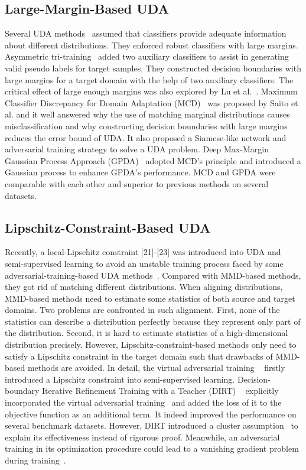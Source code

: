 \documentclass[journal,twocolumn]{IEEEtran}
\theoremstyle{definition}
\begin{document}
\subsection{Large-Margin-Based UDA}
Several UDA methods~\cite{pmlr-v70-saito17a,saito2018maximum} assumed that classifiers provide adequate information about different distributions. They enforced robust classifiers with large margins. Asymmetric tri-training~\cite{pmlr-v70-saito17a} added two auxiliary classifiers to assist in generating valid pseudo labels for target samples. They constructed decision boundaries with large margins for a target domain with the help of two auxiliary classifiers. The critical effect of large enough margins was also explored by Lu et al.~\cite{8325317}. Maximum Classifier Discrepancy for Domain Adaptation (MCD)~\cite{saito2018maximum} was proposed by Saito et al. and it well answered why the use of matching marginal distributions causes misclassification and why constructing decision boundaries with large margins reduces the error bound of UDA. It also proposed a Siamese-like network and adversarial training strategy to solve a UDA problem. Deep Max-Margin Gaussian Process Approach (GPDA)~\cite{8953535} adopted MCD's principle and introduced a Gaussian process to enhance GPDA's performance. MCD and GPDA were comparable with each other and superior to previous methods on several datasets.

\subsection{Lipschitz-Constraint-Based UDA} 
Recently, a local-Lipschitz constraint [21]-[23]
was introduced into UDA and semi-supervised learning to avoid an unstable training process faced by some adversarial-training-based UDA methods~\cite{8833506}. Compared with MMD-based methods, they got rid of matching different distributions. When aligning distributions, MMD-based methods need to estimate some statistics of both source and target domains. Two problems are confronted in such alignment. First, none of the statistics can describe a distribution perfectly because they represent only part of the distribution. Second, it is hard to estimate statistics of a high-dimensional distribution precisely. However, Lipschitz-constraint-based methods only need to satisfy a Lipschitz constraint in the target domain such that drawbacks of MMD-based methods are avoided. In detail, the virtual adversarial training ~\cite{miyato2018virtual} firstly introduced a Lipschitz constraint into semi-supervised learning. Decision-boundary Iterative Refinement Training with a Teacher (DIRT) ~\cite{shu2018a} explicitly incorporated the virtual adversarial training~\cite{miyato2018virtual} and added the loss of it to the objective function as an additional term. It indeed improved the performance on several benchmark datasets. However, DIRT introduced a cluster assumption~\cite{grandvalet2004semi-supervised} to explain its effectiveness instead of rigorous proof. Meanwhile, an adversarial training in its optimization procedure could lead to a vanishing gradient problem during training~\cite{8833506}.
\end{document}
